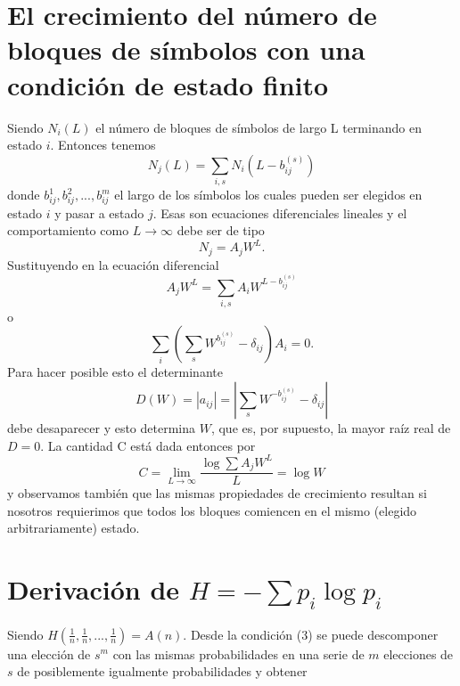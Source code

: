 \begin{appendices}

\chapter{El crecimiento del n\'umero de bloques de s\'imbolos con una
condici\'on de estado finito}
\label{aini:1}

Siendo $N_{i}(L)$ el n\'umero de bloques de s\'imbolos de largo L
terminando en estado $i$.  Entonces tenemos
\begin{equation}
N_{j}(L)=\sum_{i,s} N_{i}(L-b_{ij}^{(s)})
\end{equation}
donde $b_{ij}^{1},b_{ij}^{2},...,b_{ij}^{m}$ el largo de los s\'imbolos los cuales pueden 
ser elegidos en estado $i$ y pasar a estado $j$. Esas son ecuaciones diferenciales lineales 
y el comportamiento como $L\rightarrow \infty $ debe ser de tipo
\begin{equation}
N_{j}=A_{j}W^{L}.
\end{equation}
Sustituyendo en la ecuaci\'on diferencial 
\begin{equation}
A_{j}W^{L} = \sum_{i,s}A_{i}W^{L-b_{ij}^{(s)}}
\end{equation}
o
\begin{equation}
\sum_{i} \left(\sum_{s}W^{b_{ij}^{(s)}}-\delta_{ij}\right)A_{i}=0.
\end{equation}
Para hacer posible esto el determinante
\begin{equation}
D(W)=\left| a_{ij}\right| =\left| \sum_{s}W^{-b_{ij}^{(s)}}-\delta_{ij}\right|
\end{equation}
debe desaparecer y esto determina $W$, que es, por supuesto, la mayor raíz real de $D = 0$.
La cantidad C est\'a dada entonces por
\begin{equation}
C = \lim_{L\rightarrow \infty}\frac{\log \sum A_{j}W^{L}}{L}=\log W
\end{equation}
y observamos tambi\'en que las mismas propiedades de crecimiento
resultan si nosotros requierimos que todos los bloques comiencen en el
mismo (elegido arbitrariamente) estado.

\clearpage

\chapter{Derivaci\'on de $H=-\sum p_{i}\log  p_{i}$}
\label{aini:2}

Siendo $H(\frac{1}{n},\frac{1}{n},...,\frac{1}{n})=A(n)$. Desde la
condici\'on (3) se puede descomponer una elecci\'on de $s^{m}$ con las
mismas probabilidades en una serie de $m$ elecciones de $s$ de
posiblemente igualmente probabilidades y obtener


\end{appendices}

